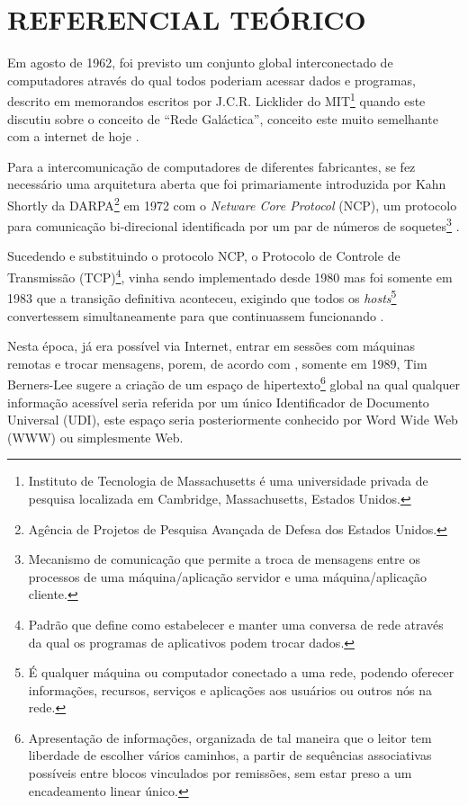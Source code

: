 \section{REFERENCIAL TEÓRICO}

Em agosto de 1962, foi previsto um conjunto global interconectado de computadores através do qual todos poderiam acessar dados e programas, descrito em memorandos escritos por J.C.R. Licklider do MIT\footnote{Instituto de Tecnologia de Massachusetts é uma universidade privada de pesquisa localizada em Cambridge, Massachusetts, Estados Unidos.} quando este discutiu sobre o conceito de “Rede Galáctica”, conceito este muito semelhante com a internet de hoje \cite[p.~2]{Leiner2009}.

Para a intercomunicação de computadores de diferentes fabricantes, se fez necessário uma arquitetura aberta que foi primariamente introduzida por Kahn Shortly da DARPA\footnote{Agência de Projetos de Pesquisa Avançada de Defesa dos Estados Unidos.} em 1972 com o \emph{Netware Core Protocol} (NCP), um protocolo para comunicação bi-direcional identificada por um par de números de soquetes\footnote{Mecanismo de comunicação que permite a troca de mensagens entre os processos de uma máquina/aplicação servidor e uma máquina/aplicação cliente.} \cite[p.~4]{Leiner2009}.

Sucedendo e substituindo o protocolo NCP, o Protocolo de Controle de Transmissão (TCP)\footnote{Padrão que define como estabelecer e manter uma conversa de rede através da qual os programas de aplicativos podem trocar dados.}, vinha sendo implementado desde 1980 mas foi somente em 1983 que a transição definitiva aconteceu, exigindo que todos os \emph{hosts}\footnote{É qualquer máquina ou computador conectado a uma rede, podendo oferecer informações, recursos, serviços e aplicações aos usuários ou outros nós na rede.} convertessem simultaneamente para que continuassem funcionando \cite[p.~7]{Leiner2009}.

Nesta época, já era possível via Internet, entrar em sessões com máquinas remotas e trocar mensagens, porem, de acordo com , somente em 1989, Tim Berners-Lee sugere a criação de um espaço de hipertexto\footnote{Apresentação de informações, organizada de tal maneira que o leitor tem liberdade de escolher vários caminhos, a partir de sequências associativas possíveis entre blocos vinculados por remissões, sem estar preso a um encadeamento linear único.} global na qual qualquer informação acessível seria referida por um único Identificador de Documento Universal (UDI), este espaço seria posteriormente conhecido por Word Wide Web (WWW) ou simplesmente Web.

